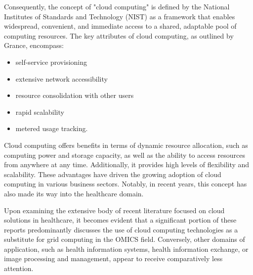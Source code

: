 \documentclass{article}
\begin{document}
Consequently, the concept of "cloud computing" is defined by the National Institutes of Standards and Technology (NIST) as a framework that enables widespread, convenient, and immediate access to a shared, adaptable pool of computing resources. The key attributes of cloud computing, as outlined by Grance, encompass:

\begin{itemize}
    \item self-service provisioning
    \item extensive network accessibility
    \item resource consolidation with other users
    \item rapid scalability
    \item metered usage tracking.
\end{itemize}

Cloud computing offers benefits in terms of dynamic resource allocation, such as computing power and storage capacity, as well as the ability to access resources from anywhere at any time. Additionally, it provides high levels of flexibility and scalability. These advantages have driven the growing adoption of cloud computing in various business sectors. Notably, in recent years, this concept has also made its way into the healthcare domain.

Upon examining the extensive body of recent literature focused on cloud solutions in healthcare, it becomes evident that a significant portion of these reports predominantly discusses the use of cloud computing technologies as a substitute for grid computing in the OMICS field. Conversely, other domains of application, such as health information systems, health information exchange, or image processing and management, appear to receive comparatively less attention.
\end{document}
